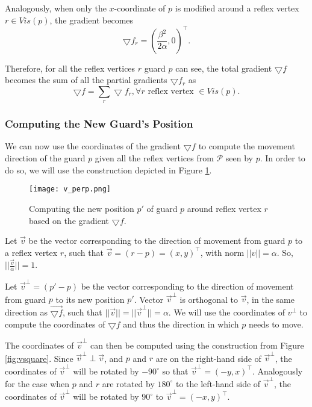 Analogously, when only the $x$-coordinate of $p$ is modified around a reflex vertex $r \in Vis(p)$, the gradient becomes $$\bigtriangledown f_r = (\frac{\beta^2}{2\alpha}, 0)^\intercal.$$

Therefore, for all the reflex vertices $r$ guard $p$ can see, the total gradient $\bigtriangledown f$ becomes the sum of all the partial gradients $\bigtriangledown f_r$ as $$\bigtriangledown f = \sum_r \bigtriangledown f_r, \forall r \text{ reflex vertex } \in Vis(p).$$

\subsubsection{Computing the New Guard's Position}
We can now use the coordinates of the gradient $\bigtriangledown f$ to compute the movement direction of the guard $p$ given all the reflex vertices from $\mathcal P$ seen by $p$. In order to do so, we will use the construction depicted in Figure \ref{fig:vperp}. 

\begin{figure}[h!]
    \centering
    \texttt{[image: v\_perp.png]}
    \caption{Computing the new position $p'$ of guard $p$ around reflex vertex $r$ based on the gradient $\bigtriangledown f$.}
    \label{fig:vperp}
\end{figure}

Let $\vec v$ be the vector corresponding to the direction of movement from guard $p$ to a reflex vertex $r$, such that $\vec{v} = (r - p) = (x, y)^\intercal$, with norm $||v|| = \alpha$. So, $||\frac{\vec v}{\alpha}|| = 1$.

Let $\vec{v}^\perp  = (p' - p)$ be the vector corresponding to the direction of movement from guard $p$ to its new position $p'$. Vector $\vec v^\perp$ is orthogonal to $\vec{v}$, in the same direction as $\vec{\bigtriangledown f}$, such that $||\vec{v}|| = ||\vec{v}^\perp|| = \alpha$. We will use the coordinates of $v^\perp$ to compute the coordinates of $\bigtriangledown f$ and thus the direction in which $p$ needs to move.

The coordinates of $\vec v^\perp$ can then be computed using the construction from Figure \ref{fig:vsquare}. Since $\vec v^\perp \perp \vec v$, and $p$ and $r$ are on the right-hand side of $\vec v^\perp$, the coordinates of $\vec v^\perp$ will be rotated by $-90^\circ$ so that $\vec v^\perp = (-y, x)^\intercal$. Analogously for the case when $p$ and $r$ are rotated by $180^\circ$ to the left-hand side of $\vec v^\perp$, the coordinates of $\vec v^\perp$ will be rotated by $90^\circ$ to $\vec v^\perp = (-x, y)^\intercal$.

